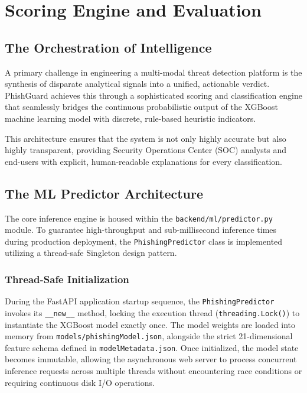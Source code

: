 \chapter{Scoring Engine and Evaluation}
\label{scoring-engine-and-evaluation}

\section{The Orchestration of
Intelligence}\label{the-orchestration-of-intelligence}

A primary challenge in engineering a multi-modal threat detection
platform is the synthesis of disparate analytical signals into a
unified, actionable verdict. PhishGuard achieves this through a
sophisticated scoring and classification engine that seamlessly bridges
the continuous probabilistic output of the XGBoost machine learning
model with discrete, rule-based heuristic indicators.

This architecture ensures that the system is not only highly accurate
but also highly transparent, providing Security Operations Center (SOC)
analysts and end-users with explicit, human-readable explanations for
every classification.

\section{The ML Predictor
Architecture}\label{the-ml-predictor-architecture}

The core inference engine is housed within the
\texttt{backend/ml/predictor.py} module. To guarantee high-throughput
and sub-millisecond inference times during production deployment, the
\texttt{PhishingPredictor} class is implemented utilizing a thread-safe
Singleton design pattern.

\subsection{Thread-Safe
Initialization}\label{thread-safe-initialization}

During the FastAPI application startup sequence, the
\texttt{PhishingPredictor} invokes its \texttt{\_\_new\_\_} method,
locking the execution thread (\texttt{threading.Lock()}) to instantiate
the XGBoost model exactly once. The model weights are loaded into memory
from \texttt{models/phishingModel.json}, alongside the strict
21-dimensional feature schema defined in \texttt{modelMetadata.json}.
Once initialized, the model state becomes immutable, allowing the
asynchronous web server to process concurrent inference requests across
multiple threads without encountering race conditions or requiring
continuous disk I/O operations.

